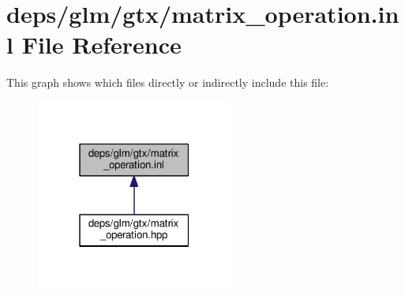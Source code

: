 \hypertarget{matrix__operation_8inl}{}\section{deps/glm/gtx/matrix\+\_\+operation.inl File Reference}
\label{matrix__operation_8inl}
This graph shows which files directly or indirectly include this file\+:
\nopagebreak
\begin{figure}[H]
\begin{center}
\leavevmode
\includegraphics[width=183pt]{d8/d54/matrix__operation_8inl__dep__incl}
\end{center}
\end{figure}
